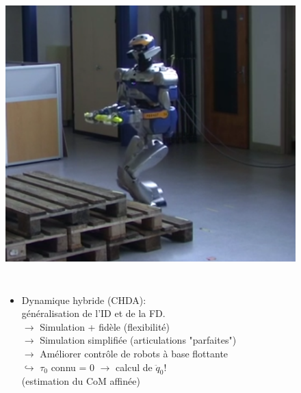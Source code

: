 \documentclass[10pt]{beamer}
\begin{document}
\begin{frame}[allowframebreaks]
\begin{figure}[T]
\begin{columns}[T]
\begin{column}{.3\textwidth}
\begin{center}
		  \bigskip
			\href{run:/home/nuno/Documents/Stage/Documents/Videos/14-ichr-metapod-v6-submitted.mp4}{\includegraphics[width=.9\textwidth]{figs/hrp2Control}}
			\hfill
			\end{center}
		\end{column}
	\end{columns}
	\end{figure}
	  
	\framebreak
	\begin{figure}[H]
	\begin{columns}[T]
	  \begin{column}{.7\textwidth}
			\begin{block}{}
			\begin{spacing}{1.2}
			\begin{itemize}
			\item Dynamique hybride (CHDA): \\
			      généralisation de l'ID et de la FD.\\
			      $\rightarrow$ Simulation + fidèle (flexibilité) \\
		        $\rightarrow$ Simulation simplifiée (articulations "parfaites") \\
		        $\rightarrow$ Améliorer contrôle de robots à base flottante \\
		                      $\hookrightarrow$ $\tau_0$ connu = 0 $\rightarrow$ calcul de $\ddot{q}_0$! \\
		                                        (estimation du CoM affinée)
		  \end{itemize}
		  \end{spacing}
		  \end{block}
			

\end{column}
\end{columns}
\end{figure}
\end{frame}
\end{document}
